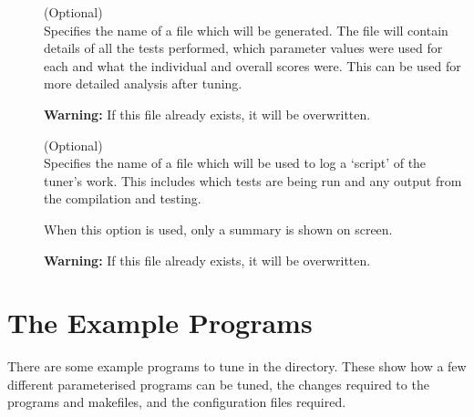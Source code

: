 \documentclass[a4paper, draft]{article}
\begin{document}
\begin{description}

    \item[] (Optional) \\
        Specifies the name of a  file which will be generated. 
        The file will contain details of all the tests performed, which 
        parameter values were used for each and what the individual and 
        overall scores were. This can be used for more detailed analysis 
        after tuning. 
        
        \textbf{Warning:} If this file already exists, it will be overwritten.
    
    \item[] (Optional) \\
        Specifies the name of a file which will be used to log a `script' of 
        the tuner's work. This includes which tests are being run and any 
        output from the compilation and testing.
        
        When this option is used, only a summary is shown on screen.
        
        \textbf{Warning:} If this file already exists, it will be overwritten.
    
\end{description}








\clearpage


\section{The Example Programs}
There are some example programs to tune in the  directory.
These show how a few different parameterised programs can be tuned, the 
changes required to the programs and makefiles, and the configuration files 
required.
\end{document}
